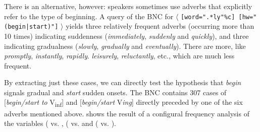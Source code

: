 There is an alternative, however: speakers sometimes use adverbs  that explicitly refer to the type of beginning. A query of the BNC  for $\langle$ \texttt{[word=".*ly"\%c] [hw="(begin|start)"]} $\rangle$ yields three relatively frequent adverbs  (occurring more than 10 times) indicating suddenness (\textit{immediately}, \textit{suddenly} and \textit{quickly}), and three indicating gradualness (\textit{slowly}, \textit{gradually} and \textit{eventually}). There are more, like \textit{promptly}, \textit{instantly}, \textit{rapidly}. \textit{leisurely}, \textit{reluctantly}, etc., which are much less  frequent.

By extracting  just these cases, we can directly test the hypothesis that \textit{begin} signals gradual and \textit{start} sudden onsets. The BNC  contains 307 cases of [\textit{begin\slash start} \textit{to} V\textsubscript{inf}] and [\textit{begin\slash start} V\textit{ing}] directly preceded by one of the six adverbs  mentioned above.  shows the result of a configural  frequency analysis of the variables  ( vs. ,   ( vs.  and  ( vs. ).
\vfill
